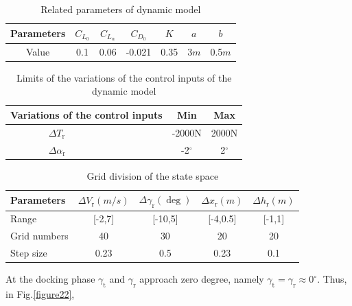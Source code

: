 \begin{table}[ptb]
	\caption{Related parameters of dynamic model}
	\label{related parameters}%
	\centering%
	\begin{tabular}{c|c|c|c|c|c|c}
		\hline\hline
		Parameters & $C_{L_{0}}$ & $C_{L_{\alpha}}$ & $C_{D_{0}}$ & $K$ & $a$ & $b$
		\\ \hline
		Value & 0.1 & 0.06 & -0.021 & 0.35 & 3$m$ & 0.5$m$ \\ \hline\hline
	\end{tabular}
\end{table}
\begin{table}[ptb]
	\caption{Limits of the variations of the control inputs of the dynamic model}
	\label{control limits}%
	\centering%
	\begin{tabular}{l|c|c}
		\hline\hline
		Variations of the control inputs & Min & Max \\ \hline
		$\ \ \ \ \ \ \ \ \ \ \ \ \ \ \ \ \ \ \Delta T_\text{r}$ & -2000N & 2000N \\ \hline
		$\ \ \ \ \ \ \ \ \ \ \ \ \ \ \ \ \ \ \Delta \alpha_\text{r}$ & -2${{}^{\circ}}$ &
		2${{}^{\circ}}$ \\ \hline\hline
	\end{tabular}
\end{table}
\begin{table}[ptb]
	\caption{Grid division of the state space}
	\label{Grid division}%
	\centering%
	\begin{tabular}{l|cccc}
		\hline\hline
		Parameters & $\Delta V_\text{r}(m/s)$ & $\Delta \gamma_\text{r}(\deg)$ & $\Delta
		x_\text{r}(m)$ & $\Delta h_\text{r}(m)$ \\ \hline
		Range & [-2,7] & [-10,5] & [-4,0.5] & [-1,1] \\ \hline
		Grid numbers & 40 & 30 & 20 & 20 \\ \hline
		Step size & 0.23 & 0.5 & 0.23 & 0.1 \\ \hline\hline
	\end{tabular}
\end{table}
At the docking phase $\gamma_\text{t}$ and $\gamma_\text{r}$ approach zero degree,
namely $\gamma_\text{t}=\gamma_\text{r}\approx0^{\circ}$. Thus, in Fig.\ref{figure22},
